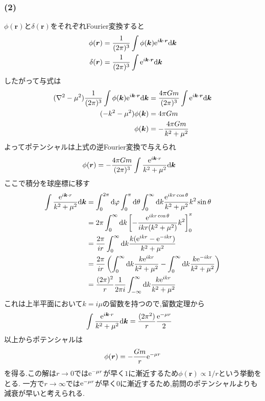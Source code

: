 \documentclass[uplatex,a4j,11pt,dvipdfmx]{jsarticle}
\begin{document}
\subsubsection*{(2)}
$\phi({\bm r})$と$\delta({\bm r})$をそれぞれFourier変換すると
\begin{align*}
  \phi({\bm r})&=\frac{1}{(2\pi)^3}\int\phi({\bm k}){\rm e}^{i{\bm k}\cdot{\bm r}}{\rm d}{\bm k}\\
  \delta({\bm r})&=\frac{1}{(2\pi)^3}\int{\rm e}^{i{\bm k}\cdot{\bm r}}{\rm d}{\bm k}
\end{align*}
したがって与式は
\begin{align*}
  (\nabla^2-\mu^2)\frac{1}{(2\pi)^3}\int\phi({\bm k}){\rm e}^{i{\bm k}\cdot{\bm r}}{\rm d}{\bm k}&=\frac{4\pi Gm}{(2\pi)^3}\int{\rm e}^{i{\bm k}\cdot{\bm r}}{\rm d}{\bm k}\\
  (-k^2-\mu^2)\phi({\bm k})&=4\pi Gm\\
  \phi({\bm k})&=-\frac{4\pi Gm}{k^2+\mu^2}
\end{align*}
よってポテンシャルは上式の逆Fourier変換で与えられ
\begin{align*}
  \phi({\bm r})&=-\frac{4\pi Gm}{(2\pi)^3}\int\frac{{\rm e}^{i{\bm k\cdot r}}}{k^2+\mu^2}{\rm d}{\bm k}
\end{align*}
ここで積分を球座標に移す
\begin{align*}
  \int\frac{{\rm e}^{i{\bm k\cdot r}}}{k^2+\mu^2}{\rm d}{\bm k}&=\int_0^{2\pi}{\rm d}\varphi\int_0^{\pi}{\rm d}\theta\int_0^{\infty}{\rm d}k
  \frac{{\rm e}^{ikr\cos\theta}}{k^2+\mu^2}k^2\sin\theta\\
  &=2\pi\int_0^\infty{\rm d}k\left[-\frac{{\rm e}^{ikr\cos\theta}}{ikr(k^2+\mu^2)}k^2\right]_0^\pi\\
  &=\frac{2\pi}{ir}\int^\infty_0{\rm d}k\frac{k({\rm e}^{ikr}-{\rm e}^{-ikr})}{k^2+\mu^2}\\
  &=\frac{2\pi}{ir}\left(\int^\infty_0{\rm d}k\frac{k{\rm e}^{ikr}}{k^2+\mu^2}-\int^\infty_0{\rm d}k\frac{k{\rm e}^{-ikr}}{k^2+\mu^2}\right)\\
  &=\frac{(2\pi)^2}{r}\frac{1}{2\pi i}\int^\infty_{-\infty}{\rm d}k\frac{k{\rm e}^{ikr}}{k^2+\mu^2}
\end{align*}
これは上半平面において$k=i\mu$の留数を持つので,留数定理から
\begin{align*}
  \int\frac{{\rm e}^{i{\bm k\cdot r}}}{k^2+\mu^2}{\rm d}{\bm k}&=\frac{(2\pi^2)}{r}\frac{{\rm e}^{-\mu r}}{2}
\end{align*}
以上からポテンシャルは
\begin{align*}
  \phi({\bm r})=-\frac{Gm}{r}{\rm e}^{-\mu r}
\end{align*}
を得る.この解は$r\rightarrow 0$では${\rm e}^{-\mu r}$が早く$1$に漸近するため$\phi({\bm r})\propto1/r$という挙動をとる.
一方で$r\rightarrow\infty$では${\rm e}^{-\mu r}$が早く$0$に漸近するため,前問のポテンシャルよりも減衰が早いと考えられる.
\end{document}

